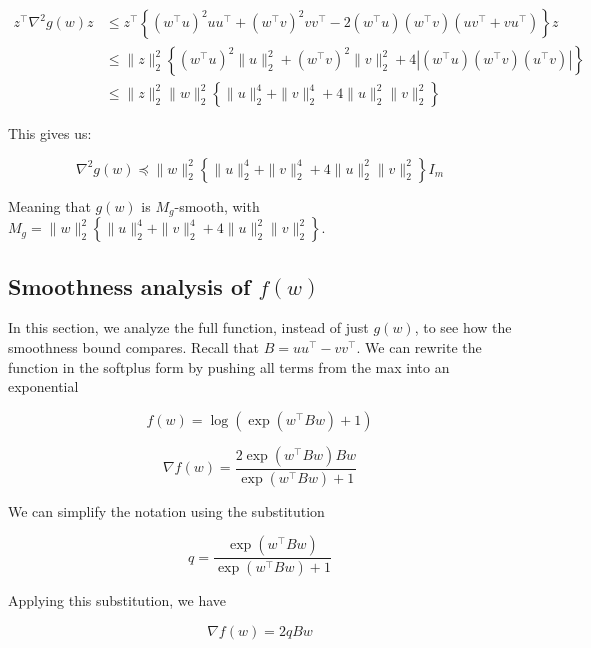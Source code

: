 \documentclass[11pt]{article}
\begin{document}
\begin{align*}
    z^{\top} \nabla^2 g(w) z &\leq
    z^{\top} \left\{ (w^{\top}u)^2 uu^{\top} + (w^{\top}v)^2 vv^{\top} - 2 (w^{\top}u)(w^{\top}v)(uv^{\top} + vu^{\top}) \right\} z \\
    &\leq \|z\|_2^2 \left\{ (w^{\top}u)^2 \|u\|_2^2 + (w^{\top}v)^2 \|v\|_2^2 + 4 \left| (w^{\top}u)(w^{\top}v)(u^{\top}v) \right| \right\} \\
    &\leq \|z\|_2^2 \|w\|_2^2 \left\{ \|u\|_2^4 + \|v\|_2^4 + 4 \|u\|_2^2 \|v\|_2^2 \right\}
\end{align*}

This gives us:

\begin{equation}
    \nabla^2 g(w) \preceq \|w\|_2^2 \left\{ \|u\|_2^4 + \|v\|_2^4 + 4 \|u\|_2^2 \|v\|_2^2 \right\} I_m
\end{equation}

Meaning that $g(w)$ is $M_g$-smooth, with $M_g = \|w\|_2^2 \left\{ \|u\|_2^4 + \|v\|_2^4 + 4 \|u\|_2^2 \|v\|_2^2 \right\}$.

\subsection{Smoothness analysis of $f(w)$}

In this section, we analyze the full function, instead of just $g(w)$, to see how the smoothness bound compares. Recall that $B = uu^\top - vv^\top$. We can rewrite the function in the softplus form by pushing all terms from the max into an exponential

\begin{equation}
\label{eq:f}
    f(w) = \log(\exp(w^{\top}Bw) + 1)
\end{equation}

\begin{equation}
    \nabla f(w) = \frac{2 \exp(w^{\top}Bw)Bw}{\exp(w^{\top}Bw) + 1}
\end{equation}

We can simplify the notation using the substitution

\begin{equation}
q = \frac{\exp(w^{\top}Bw)}{\exp(w^{\top}Bw) + 1}
\end{equation}

Applying this substitution, we have

\begin{equation}
\label{eq:grad_f}
    \nabla f(w) = 2qBw
\end{equation}
\end{document}
